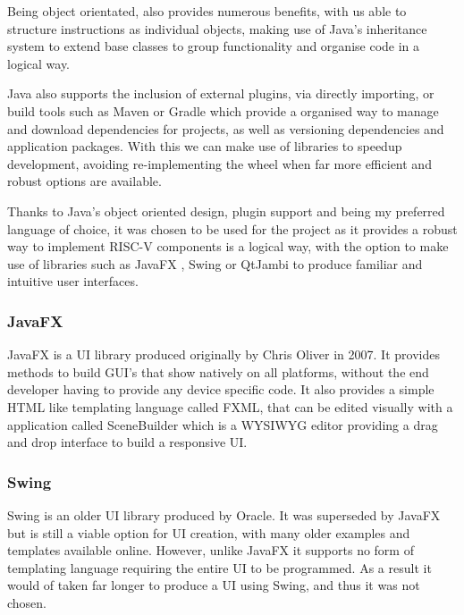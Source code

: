 Being object orientated, also provides numerous benefits, with us able to structure instructions as individual objects, making use of Java's inheritance system to extend base classes to group functionality and organise code in a logical way.

Java also supports the inclusion of external plugins, via directly importing, or build tools such as Maven \cite{porter_2022_maven} or Gradle \cite{gradleinc_2023_gradle} which provide a organised way to manage and download dependencies for projects, as well as versioning dependencies and application packages. With this we can make use of libraries to speedup development, avoiding re-implementing the wheel when far more efficient and robust options are available.

Thanks to Java's object oriented design, plugin support and being my preferred language of choice, it was chosen to be used for the project as it provides a robust way to implement RISC-V components is a logical way, with the option to make use of libraries such as JavaFX \cite{sunmicrosystems_2022_javafx}, Swing \cite{oconner_2007_using} or QtJambi \cite{omixvisualization_2023_omixvisualizationqtjambi} to produce familiar and intuitive user interfaces.

\subsubsection{JavaFX}
JavaFX \cite{sunmicrosystems_2022_javafx} is a \ac{UI} library produced originally by Chris Oliver in 2007. It provides methods to build GUI's that show natively on all platforms, without the end developer having to provide any device specific code. It also provides a simple HTML like templating language called FXML, that can be edited visually with a application called SceneBuilder \cite{gluon_2022_scene} which is a \ac{WYSIWYG} editor providing a drag and drop interface to build a responsive \ac{UI}.

\subsubsection{Swing}
Swing \cite{oconner_2007_using} is an older \ac{UI} library produced by Oracle. It was superseded by JavaFX but is still a viable option for \ac{UI} creation, with many older examples and templates available online. However, unlike JavaFX it supports no form of templating language requiring the entire \ac{UI} to be programmed. As a result it would of taken far longer to produce a \ac{UI} using Swing, and thus it was not chosen.

